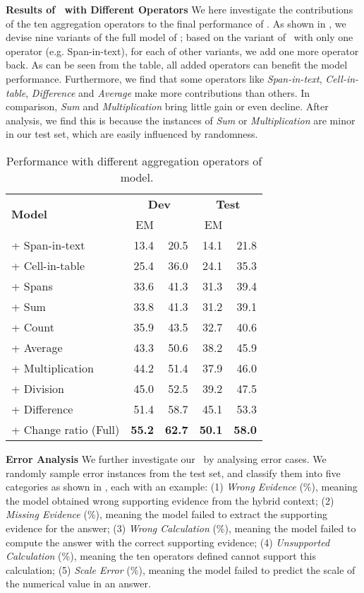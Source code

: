 \noindent \textbf{Results of \tagop~with Different Operators}
We here investigate the contributions of the ten aggregation operators to the final performance of \tagop.
As shown in , we devise nine variants of the full model of \tagop; based on the variant of \tagop~with only one operator (e.g. Span-in-text), for each of other variants, we add one more operator back.
As can be seen from the table, all added operators can benefit the model performance.
Furthermore, we find that some operators like \emph{Span-in-text}, \emph{Cell-in-table}, \emph{Difference} and \emph{Average} make more contributions than others.
In comparison, \emph{Sum} and \emph{Multiplication} bring little gain or even decline.
After analysis, we find this is because the instances of \emph{Sum} or \emph{Multiplication} are minor in our test set, which are easily influenced by randomness.

\begin{table}
    \small
    \centering
    \begin{tabular}{lrrrr}
    \toprule
     \multirow{2}{*}{\bf Model}    & \multicolumn{2}{c}{\bf Dev} & \multicolumn{2}{c}{\bf Test} \\
     \cmidrule(lr){2-3}
     \cmidrule(lr){4-5}
         & EM & \fone{} & EM&  \fone{}\\
    \midrule
    + Span-in-text & 13.4 & 20.5 & 14.1 & 21.8 \\
    + Cell-in-table & 25.4 & 36.0 & 24.1 & 35.3 \\
    + Spans & 33.6 & 41.3 & 31.3 & 39.4 \\
    + Sum & 33.8 & 41.3 & 31.2 & 39.1 \\
    + Count & 35.9 & 43.5 & 32.7 & 40.6 \\
    + Average & 43.3 & 50.6 & 38.2 & 45.9 \\
    + Multiplication & 44.2 & 51.4 & 37.9 & 46.0 \\
    + Division & 45.0 & 52.5 & 39.2 & 47.5 \\
    + Difference & 51.4 & 58.7 & 45.1 & 53.3 \\
    + Change ratio (Full) & \bf 55.2 & \bf 62.7 & \bf 50.1 & \bf 58.0 \\
    \bottomrule
    \end{tabular}
    \caption{Performance with different aggregation operators of \tagop~model.}
    \label{tab:op-ablation}
\end{table}


\noindent \textbf{Error Analysis}
We further investigate our \tagop~by analysing error cases. 
We randomly sample  error instances from the test set, and classify them into five categories as shown in , each with an example:
(1) \emph{Wrong Evidence} (\%), meaning the model obtained wrong supporting evidence from the hybrid context;
(2) \emph{Missing Evidence} (\%), meaning the model failed to extract the supporting evidence for the answer;
(3) \emph{Wrong Calculation} (\%), meaning the model failed to compute the answer with the correct supporting evidence;
(4) \emph{Unsupported Calculation} (\%), meaning the ten operators defined cannot support this calculation;
(5) \emph{Scale Error} (\%), meaning the model failed to predict the scale of the numerical value in an answer.

